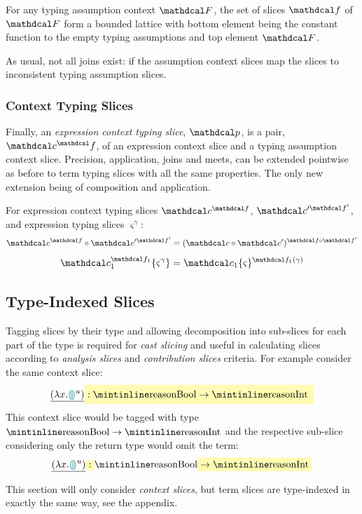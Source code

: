 \begin{conjecture}
For any typing assumption context $\F$, the set of slices $\f$ of $\F$ form a bounded lattice with bottom element being the constant function to the empty typing assumptions and top element $\F$.
\end{conjecture}

As usual, not all joins exist: if the assumption context slices map the slices to inconsistent typing assumption slices. 
\subsubsection{Context Typing Slices}
Finally, an \textit{expression context typing slice}, $\p$, is a pair, $\Cs^\f$, of an expression context slice and a typing assumption context slice. Precision, application, joins and meets, can be extended pointwise as before to term typing slices with all the same properties. The only new extension being of composition and application.
\begin{definition}
For expression context typing slices $\Cs^{\f}$, $\Cs'^{\f'}$, and expression typing slices $\varsigma^{\gamma}$:
\[\Cs^{\f} \circ \Cs'^{\f'} =  (\Cs \circ \Cs')^{\f \circ \f'}\]
\[\Cs_1^{\f_1}\{\varsigma^{\gamma}\} =  \Cs_1\{\varsigma\}^{\f_1(\gamma)}\]
\end{definition}

\subsection{Type-Indexed Slices}\label{sec:TypeIndexedSlices}
Tagging slices by their type and allowing decomposition into sub-slices for each part of the type is required for \textit{cast slicing} and useful in calculating slices according to \textit{analysis slices} and \textit{contribution slices} criteria. For example consider the same context slice:
\[\underline{(\lambda x. \hole^u )} \hlcmaths[yellow!30]{:  \code{Bool} \hlcmaths[yellow!30]{\to \code{Int}}}\]
This context slice would be tagged with type $\code{Bool} \to \code{Int}$ and the respective sub-slice considering only the return type would omit the  term:
\[\underline{(\lambda x. \hole^u )} \hlcmaths[yellow!30]{:}  \code{Bool} \hlcmaths[yellow!30]{\to \code{Int}}\]

This section will only consider \textit{context slices}, but term slices are type-indexed in exactly the same way, see the appendix.

